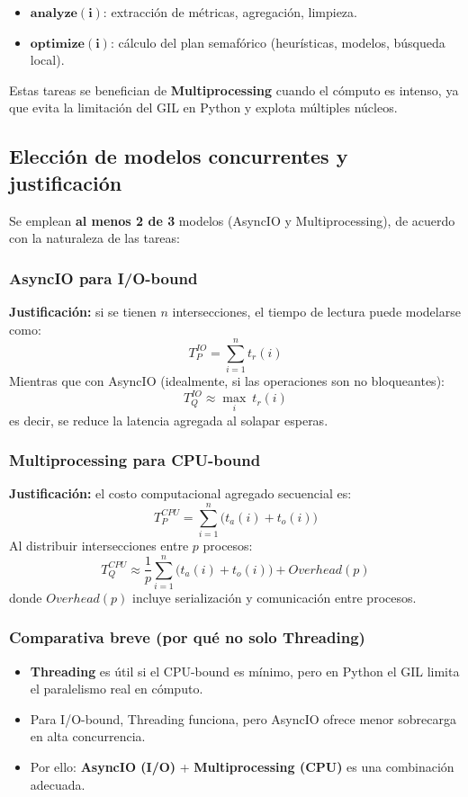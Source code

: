 \documentclass[12pt]{article}
\begin{document}
\begin{itemize}
\item \(\mathbf{analyze(i)}\): extracción de métricas, agregación, limpieza.
\item \(\mathbf{optimize(i)}\): cálculo del plan semafórico (heurísticas, modelos, búsqueda local).
\end{itemize}

Estas tareas se benefician de \textbf{Multiprocessing} cuando el cómputo es intenso, ya que evita la limitación del GIL en Python y explota múltiples núcleos.

\subsection{Elección de modelos concurrentes y justificación}

Se emplean \textbf{al menos 2 de 3} modelos (AsyncIO y Multiprocessing), de acuerdo con la naturaleza de las tareas:

\subsubsection{AsyncIO para I/O-bound}

\textbf{Justificación:} si se tienen \(n\) intersecciones, el tiempo de lectura puede modelarse como:
\[
T^{IO}_P = \sum_{i=1}^n t_r(i)
\]
Mientras que con AsyncIO (idealmente, si las operaciones son no bloqueantes):
\[
T^{IO}_Q \approx \max_{i} \ t_r(i)
\]
es decir, se reduce la latencia agregada al solapar esperas.

\subsubsection{Multiprocessing para CPU-bound}

\textbf{Justificación:} el costo computacional agregado secuencial es:
\[
T^{CPU}_P = \sum_{i=1}^n \big(t_a(i) + t_o(i)\big)
\]
Al distribuir intersecciones entre \(p\) procesos:
\[
T^{CPU}_Q \approx \frac{1}{p}\sum_{i=1}^n \big(t_a(i) + t_o(i)\big) + Overhead(p)
\]
donde \(Overhead(p)\) incluye serialización y comunicación entre procesos.

\subsubsection{Comparativa breve (por qué no solo Threading)}

\begin{itemize}
\item \textbf{Threading} es útil si el CPU-bound es mínimo, pero en Python el GIL limita el paralelismo real en cómputo.
\item Para I/O-bound, Threading funciona, pero AsyncIO ofrece menor sobrecarga en alta concurrencia.
\item Por ello: \textbf{AsyncIO (I/O)} + \textbf{Multiprocessing (CPU)} es una combinación adecuada.
\end{itemize}
\end{document}
